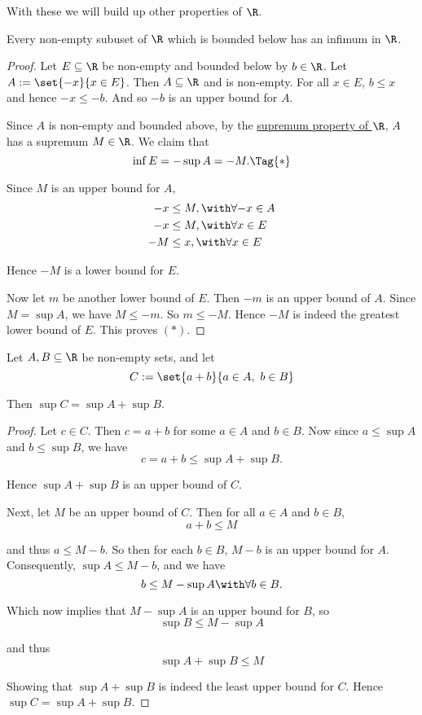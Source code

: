 With these we will build up other properties of $\R$.

\label{ab2a2fe}

Every non-empty subuset of $\R$ which is bounded below has an infimum in $\R$.

\begin{proof}

  Let $E\subseteq\R$ be non-empty and bounded below by $b\in\R$. Let
  $A:=\set{-x}{x\in E}$. Then $A\subseteq\R$ and is non-empty. For all $x\in E$,
  $b\leq x$ and hence $-x\leq-b$. And so $-b$ is an upper bound for $A$.

  Since $A$ is non-empty and bounded above, by the \href{f330cf9}{supremum
  property of $\R$}, $A$ has a supremum $M\in\R$. We claim that
  \begin{equation*}
    \inf E=-\sup A=-M.\Tag{*}
  \end{equation*}

  Since $M$ is an upper bound for $A$,
  \begin{align*}
    -x &\leq M,\with\forall{-x}\in A \\
    -x &\leq M,\with\forall{x}\in E  \\
    -M &\leq x,\with\forall{x}\in E
  \end{align*}

  Hence $-M$ is a lower bound for $E$.

  Now let $m$ be another lower bound of $E$. Then $-m$ is an upper bound of $A$.
  Since $M=\sup A$, we have $M\leq-m$. So $m\leq-M$. Hence $-M$ is indeed the
  greatest lower bound of $E$. This proves $(*)$.
\end{proof}

\label{f426fd0}

Let $A,B\subseteq\R$ be non-empty sets, and let
$$
  C:=\set{a+b}{a\in A,\ b\in B}
$$

Then $\sup C=\sup A+\sup B$.

\begin{proof}
  Let $c\in C$. Then $c=a+b$ for some $a\in A$ and $b\in B$. Now since
  $a\leq\sup A$ and $b\leq\sup B$, we have
  $$
    c=a+b\leq\sup A+\sup B.
  $$

  Hence $\sup A+\sup B$ is an upper bound of $C$.

  Next, let $M$ be an upper bound of $C$. Then for all $a\in A$ and $b\in B$,
  $$
    a+b\leq M
  $$

  and thus $a\leq M-b$. So then for each $b\in B$, $M-b$ is an upper bound for
  $A$. Consequently, $\sup A\leq M-b$, and we have
  $$
    b\leq M-\sup A\with\forall b\in B.
  $$

  Which now implies that $M-\sup A$ is an upper bound for $B$, so
  $$
    \sup B\leq M-\sup A
  $$

  and thus
  $$
    \sup A+\sup B\leq M
  $$

  Showing that $\sup A+\sup B$ is indeed the least upper bound for $C$. Hence
  $\sup C=\sup A+\sup B$.
\end{proof}

